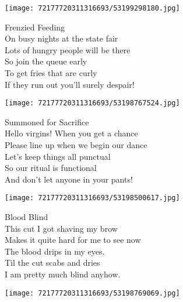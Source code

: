 \documentclass[10pt,letterpaper]{article}
\begin{document}
\begin{center}
\texttt{[image: 72177720311316693/53199298180.jpg]}
\end{center}

\begin{center}
Frenzied Feeding\\
\vskip 0.2in
On busy nights at the state fair\\
Lots of hungry people will be there\\
So join the queue early\\
To get fries that are curly\\
If they run out you'll surely despair!\\
\end{center}
\pagebreak

\begin{center}\texttt{[image: 72177720311316693/53198767524.jpg]}
\end{center}
\begin{center}
Summoned for Sacrifice\\
\vskip 0.2in
Hello virgins!  When you get a chance\\
Please line up when we begin our dance\\
Let's keep things all punctual\\
So our ritual is functional\\
And don't let anyone in your pants!\\
\end{center}
\pagebreak

\begin{center}\texttt{[image: 72177720311316693/53198500617.jpg]}
\end{center}
\begin{center}
Blood Blind\\
\vskip 0.2in
This cut I got shaving my brow\\
Makes it quite hard for me to see now\\
The blood drips in my eyes.\\
Til the cut scabs and dries\\
I am pretty much blind anyhow.\\
\end{center}
\pagebreak

\begin{center}
\texttt{[image: 72177720311316693/53198769069.jpg]}
\end{center}
\end{document}
